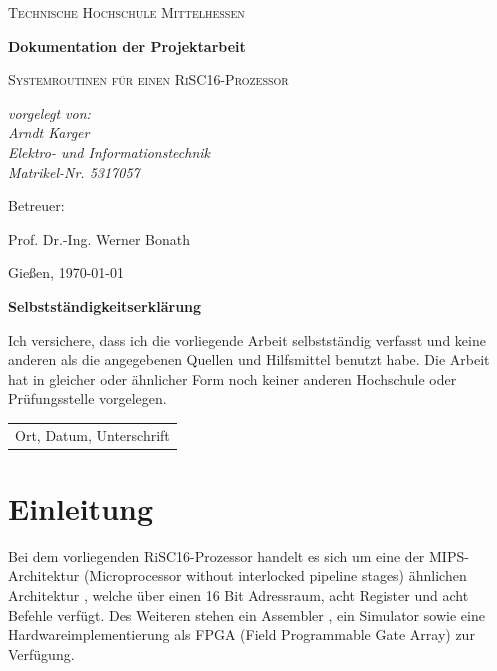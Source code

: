 \documentclass[fleqn, a4paper, 11pt]{article}       %
\begin{document}
\begin{titlepage}
	\centering
	{\scshape\LARGE Technische Hochschule Mittelhessen \par}
	\vspace{1cm}
	{\huge\bfseries Dokumentation der Projektarbeit \par}
	\vspace{1.5cm}
	{\scshape\Large Systemroutinen für einen RiSC16-Prozessor \par}
	\vspace{2cm}
	{\Large\itshape vorgelegt von: \\ Arndt Karger \\ Elektro-  und Informationstechnik\\ Matrikel-Nr. 5317057\par}
	\vfill
	Betreuer:\par
    Prof. Dr.-Ing. Werner Bonath
	\vfill

	{\large Gießen, \today\par}
\end{titlepage}

\thispagestyle{empty}
{\huge\bfseries Selbstständigkeitserklärung \par}
\vspace{1cm}

\noindent Ich versichere, dass ich die vorliegende Arbeit selbstständig verfasst und keine anderen als die angegebenen
Quellen und Hilfsmittel benutzt habe. Die Arbeit hat in gleicher oder ähnlicher Form noch keiner anderen
Hochschule oder Prüfungsstelle vorgelegen.

\vspace{4cm}
\begin{flushleft}
\begin{tabular}{@{}l@{}}\hline
Ort, Datum, Unterschrift
\end{tabular}
\end{flushleft}

\newpage
\thispagestyle{empty}
\tableofcontents
\newpage
\setcounter{page}{1}

\section{Einleitung}
Bei dem vorliegenden RiSC16-Prozessor handelt es sich um eine der MIPS-Architektur (Microprocessor without interlocked pipeline stages) \cite{MIPS} ähnlichen Architektur \cite{Ausschr}, welche über einen 16 Bit Adressraum, acht Register und acht Befehle verfügt. Des Weiteren stehen ein Assembler \cite{JACOB}, ein Simulator \cite{Bonath} sowie eine Hardwareimplementierung als FPGA (Field Programmable Gate Array) zur Verfügung. 
\end{document}
